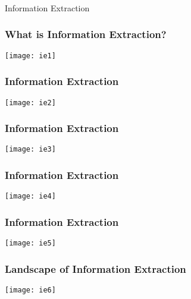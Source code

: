 \begin{frame}[fragile]\frametitle{}

\begin{center}
{\Large Information Extraction}
\end{center}
\end{frame}


\begin{frame}[fragile]
  \frametitle{What is Information Extraction?}
\begin{center}
\texttt{[image: ie1]}
\end{center}
\end{frame}


\begin{frame}[fragile]
  \frametitle{Information Extraction}
\begin{center}
\texttt{[image: ie2]}
\end{center}
\end{frame}


\begin{frame}[fragile]
  \frametitle{Information Extraction}
\begin{center}
\texttt{[image: ie3]}
\end{center}
\end{frame}

\begin{frame}[fragile]
  \frametitle{Information Extraction}
\begin{center}
\texttt{[image: ie4]}
\end{center}
\end{frame}

\begin{frame}[fragile]
  \frametitle{Information Extraction}
\begin{center}
\texttt{[image: ie5]}
\end{center}
\end{frame}

\begin{frame}[fragile]
  \frametitle{Landscape of Information Extraction}
\begin{center}
\texttt{[image: ie6]}
\end{center}
\end{frame}

